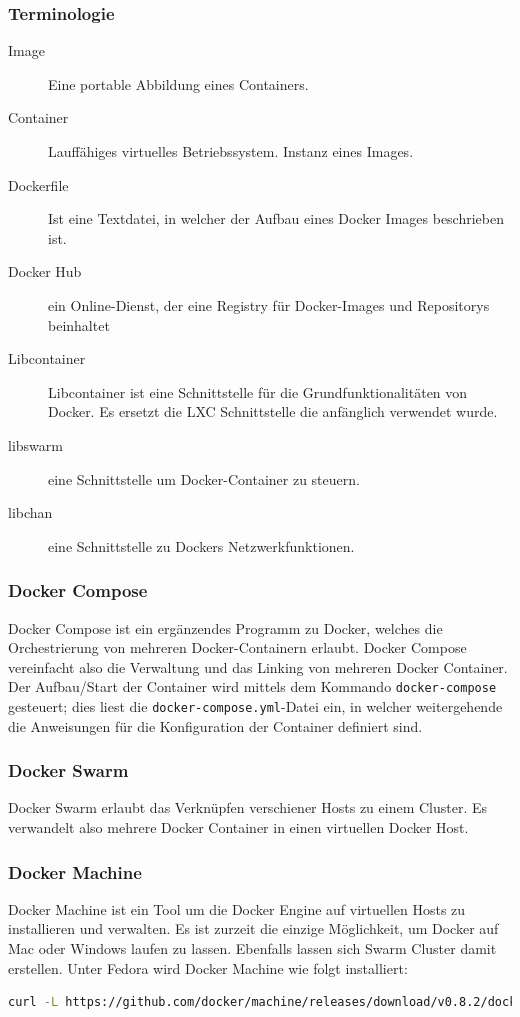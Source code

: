 \subsubsection{Terminologie}
\begin{description}
	\item[Image] Eine portable Abbildung eines Containers.
	\item[Container] Lauffähiges virtuelles Betriebssystem. Instanz eines Images.
	\item[Dockerfile] Ist eine Textdatei, in welcher der Aufbau eines Docker Images beschrieben ist.
	\item[Docker Hub] ein Online-Dienst, der eine Registry für Docker-Images und Repositorys beinhaltet
	\item[Libcontainer] Libcontainer ist eine Schnittstelle für die Grundfunktionalitäten von Docker. Es ersetzt die LXC Schnittstelle die anfänglich verwendet wurde. 
	\item[libswarm]eine Schnittstelle um Docker-Container zu steuern.
	\item[libchan] eine Schnittstelle zu Dockers Netzwerkfunktionen.
\end{description}

\subsubsection{Docker Compose}
Docker Compose ist ein ergänzendes Programm zu Docker, welches die Orchestrierung von mehreren Docker-Containern erlaubt. Docker Compose vereinfacht also die Verwaltung und das Linking von mehreren Docker Container. Der Aufbau/Start der Container wird mittels dem Kommando \lstinline|docker-compose| gesteuert; dies liest die \lstinline|docker-compose.yml|-Datei ein, in welcher weitergehende die Anweisungen für die Konfiguration der Container definiert sind.

\subsubsection{Docker Swarm}
Docker Swarm erlaubt das Verknüpfen verschiener Hosts zu einem Cluster. Es verwandelt also mehrere Docker Container in einen virtuellen Docker Host.

\subsubsection{Docker Machine}
Docker Machine ist ein Tool um die Docker Engine auf virtuellen Hosts zu installieren und verwalten. Es ist zurzeit die einzige Möglichkeit, um Docker auf Mac oder Windows laufen zu lassen. Ebenfalls lassen sich Swarm Cluster damit erstellen. Unter Fedora wird Docker Machine wie folgt installiert:
\begin{lstlisting}[language=bash]
curl -L https://github.com/docker/machine/releases/download/v0.8.2/docker-machine-`uname -s`-`uname -m` >/usr/local/bin/docker-machine && \ chmod +x /usr/local/bin/docker-machine
\end{lstlisting}

